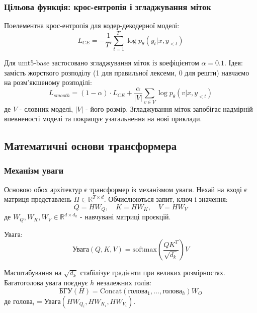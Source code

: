 \documentclass[14pt]{extarticle}
\begin{document}
\subsubsection{Цільова функція: крос-ентропія і згладжування міток}

Поелементна крос-ентропія для кодер-декодерної моделі:
\begin{equation}
  L_{CE} = -\frac{1}{T'}\sum_{t=1}^{T'} \log p_\theta(y_t|x, y_{<t})
  \label{eq:ce_element}
\end{equation}

Для umt5-base застосовано згладжування міток із коефіцієнтом $\alpha = 0.1$. Ідея: замість жорсткого розподілу (1 для правильної лексеми, 0 для решти) навчаємо на розм'якшеному розподілі:
\begin{equation}
  L_{smooth} = (1-\alpha) \cdot L_{CE} + \frac{\alpha}{|V|} \sum_{v \in V} \log p_\theta(v|x, y_{<t})
  \label{eq:label_smoothing}
\end{equation}
де $V$ - словник моделі, $|V|$ - його розмір. Згладжування міток запобігає надмірній впевненості моделі та покращує узагальнення на нові приклади.

\subsection{Математичні основи трансформера}

\subsubsection{Механізм уваги}

Основою обох архітектур є трансформер із механізмом уваги. Нехай на вході є матриця представлень $H \in \mathbb{R}^{T \times d}$. Обчислюються запит, ключ і значення:
\begin{equation}
  Q = HW_Q, \quad K = HW_K, \quad V = HW_V
  \label{eq:qkv}
\end{equation}
де $W_Q, W_K, W_V \in \mathbb{R}^{d \times d_k}$ - навчувані матриці проєкцій.

Увага:
\begin{equation}
  \text{Увага}(Q, K, V) = \text{softmax}\!\left(\frac{QK^T}{\sqrt{d_k}}\right)V
  \label{eq:attention}
\end{equation}

Масштабування на $\sqrt{d_k}$ стабілізує градієнти при великих розмірностях. Багатоголова увага поєднує $h$ незалежних голів:
\begin{equation}
  \text{БГУ}(H) = \text{Concat}(\text{голова}_1, \ldots, \text{голова}_h)W_O
  \label{eq:mha}
\end{equation}
де $\text{голова}_i = \text{Увага}(HW_{Q_i}, HW_{K_i}, HW_{V_i})$.
\end{document}

